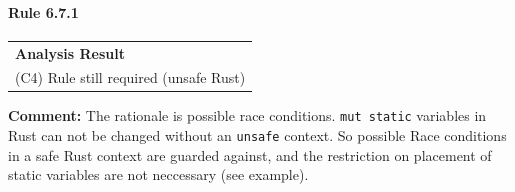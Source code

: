 \paragraph{Rule 6.7.1}
\begin{longtable}{p{13cm}}
\textbf{Analysis Result} \\
(C4) Rule still required (unsafe Rust) \\
\end{longtable}
\textbf{Comment:} The rationale is possible race conditions. \texttt{mut static} variables in Rust can not be changed without an \texttt{unsafe} context. So possible Race conditions in a safe Rust context are guarded against, and the restriction on placement of static variables are not neccessary (see example). \\


